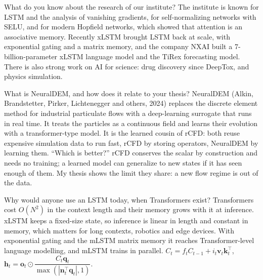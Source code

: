 \begin{qabox}{\pred What do you know about the research of our institute?}
\ans The institute is known for LSTM and the analysis of vanishing gradients, for self-normalizing
networks with SELU, and for modern Hopfield networks, which showed that attention is an associative
memory. Recently xLSTM brought LSTM back at scale, with exponential gating and a matrix memory, and
the company NXAI built a 7-billion-parameter xLSTM language model and the TiRex forecasting model.
There is also strong work on AI for science: drug discovery since DeepTox, and physics simulation.
\end{qabox}

\begin{qabox}{\pred What is NeuralDEM, and how does it relate to your thesis?}
\ans NeuralDEM (Alkin, Brandstetter, Pirker, Lichtenegger and others, 2024) replaces the discrete
element method for industrial particulate flows with a deep-learning surrogate that runs in real
time. It treats the particles as a continuous field and learns their evolution with a
transformer-type model. It is the learned cousin of rCFD: both reuse expensive simulation data to
run fast, rCFD by storing operators, NeuralDEM by learning them.
\follow ``Which is better?'' rCFD conserves the scalar by construction and needs no training;
a learned model can generalize to new states if it has seen enough of them. My thesis shows the
limit they share: a new flow regime is out of the data.
\end{qabox}

\begin{qabox}[Hochreiter]{\pred Why would anyone use an LSTM today, when Transformers exist?}
\ans Transformers cost $O(N^2)$ in the context length and their memory grows with it at
inference. xLSTM keeps a fixed-size state, so inference is linear in length and constant in memory,
which matters for long contexts, robotics and edge devices. With exponential gating and the mLSTM
matrix memory it reaches Transformer-level language modelling, and mLSTM trains in parallel.
\formula $C_t=f_tC_{t-1}+i_t\mathbf{v}_t\mathbf{k}_t^\top$,\quad
$\mathbf{h}_t=\mathbf{o}_t\odot\dfrac{C_t\mathbf{q}_t}{\max(|\mathbf{n}_t^\top\mathbf{q}_t|,1)}$.
\end{qabox}

